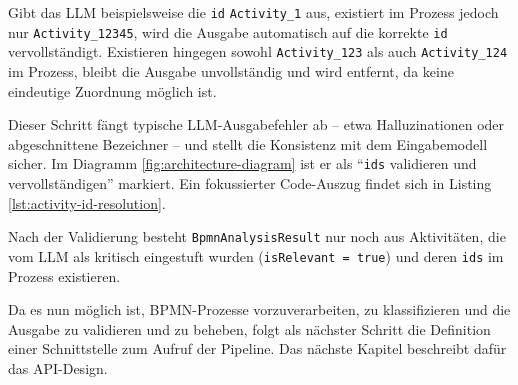Gibt das \ac{LLM} beispielsweise die \texttt{id} \texttt{Activity\_1} aus, existiert im Prozess jedoch nur \texttt{Activity\_12345}, wird die Ausgabe automatisch auf die korrekte \texttt{id} vervollständigt. Existieren hingegen sowohl \texttt{Activity\_123} als auch \texttt{Activity\_124} im Prozess, bleibt die Ausgabe unvollständig und wird entfernt, da keine eindeutige Zuordnung möglich ist.

Dieser Schritt fängt typische \ac{LLM}-Ausgabefehler ab – etwa Halluzinationen oder abgeschnittene Bezeichner – und stellt die Konsistenz mit dem Eingabemodell sicher. Im Diagramm \ref{fig:architecture-diagram} ist er als \enquote{\texttt{ids} validieren und vervollständigen} markiert. Ein fokussierter Code-Auszug findet sich in Listing \ref{lst:activity-id-resolution}.

Nach der Validierung besteht \texttt{BpmnAnalysisResult} nur noch aus Aktivitäten, die vom \ac{LLM} als kritisch eingestuft wurden (\texttt{isRelevant = true}) und deren \texttt{ids} im Prozess existieren.

Da es nun möglich ist, \ac{BPMN}-Prozesse vorzuverarbeiten, zu klassifizieren und die Ausgabe zu validieren und zu beheben, folgt als nächster Schritt die Definition einer Schnittstelle zum Aufruf der Pipeline. Das nächste Kapitel beschreibt dafür das API-Design.